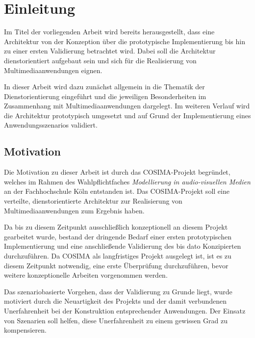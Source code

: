 
\chapter{Einleitung} %
\label{cha:einleitung}

  Im Titel der vorliegenden Arbeit wird bereits herausgestellt, dass eine Architektur von der Konzeption über die prototypische Implementierung bis hin zu einer ersten Validierung betrachtet wird. Dabei soll die Architektur dienstorientiert aufgebaut sein und sich für die Realisierung von Multimediaanwendungen eignen.
  
  In dieser Arbeit wird dazu zunächst allgemein in die Thematik der Dienstorientierung eingeführt und die jeweiligen Besonderheiten im Zusammenhang mit Multimediaanwendungen dargelegt. Im weiteren Verlauf wird die Architektur prototypisch umgesetzt und auf Grund der Implementierung eines Anwendungsszenarios validiert.

\section{Motivation} %
\label{sec:motivation}

  Die Motivation zu dieser Arbeit ist durch das COSIMA-Projekt begründet, welches im Rahmen des Wahlpflichtfaches \emph{Modellierung in audio-visuellen Medien} an der Fachhochschule Köln entstanden ist. Das COSIMA-Projekt soll eine verteilte, dienstorientierte Architektur zur Realisierung von Multimediaanwendungen zum Ergebnis haben.
  
  Da bis zu diesem Zeitpunkt ausschließlich konzeptionell an diesem Projekt gearbeitet wurde, bestand der dringende Bedarf einer ersten prototypischen Implementierung und eine anschließende Validierung des bis dato Konzipierten durchzuführen. Da COSIMA als langfristiges Projekt ausgelegt ist, ist es zu diesem Zeitpunkt notwendig, eine erste Überprüfung durchzuführen, bevor weitere konzeptionelle Arbeiten vorgenommen werden.
  
  Das szenariobasierte Vorgehen, dass der Validierung zu Grunde liegt, wurde motiviert durch die Neuartigkeit des Projekts und der damit verbundenen Unerfahrenheit bei der Konstruktion entsprechender Anwendungen. Der Einsatz von Szenarien soll helfen, diese Unerfahrenheit zu einem gewissen Grad zu kompensieren.

